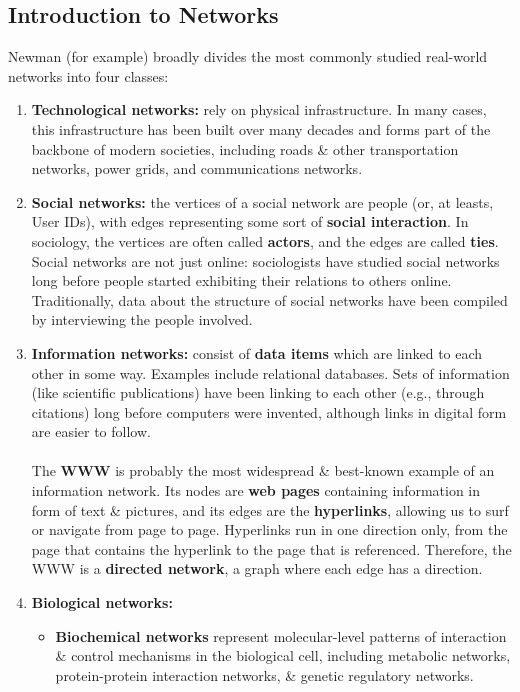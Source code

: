 \documentclass[a4paper,11pt]{article}
\begin{document}
\subsection{Introduction to Networks}
Newman (for example) broadly divides the most commonly studied real-world networks into four classes:
\begin{enumerate}
    \item   \textbf{Technological networks:} rely on physical infrastructure.
            In many cases, this infrastructure has been built over many decades and forms part of the backbone of modern societies, including roads \& other transportation networks, power grids, and communications networks.

    \item   \textbf{Social networks:} the vertices of a social network are people (or, at leasts, User IDs), with edges representing some sort of \textbf{social interaction}.
            In sociology, the vertices are often called \textbf{actors}, and the edges are called \textbf{ties}.
            Social networks are not just online: sociologists have studied social networks long before people started exhibiting their relations to others online.
            Traditionally, data about the structure of social networks have been compiled by interviewing the people involved.

    \item   \textbf{Information networks:} consist of \textbf{data items} which are linked to each other in some way.
            Examples include relational databases.
            Sets of information (like scientific publications) have been linking to each other (e.g., through citations) long before computers were invented, although links in digital form are easier to follow.
            \\\\
            The \textbf{WWW} is probably the most widespread \& best-known example of an information network.
            Its nodes are \textbf{web pages} containing information in form of text \& pictures, and its edges are the \textbf{hyperlinks}, allowing us to surf or navigate from page to page.
            Hyperlinks run in one direction only, from the page that contains the hyperlink to the page that is referenced.
            Therefore, the WWW is a \textbf{directed network}, a graph where each edge has a direction.

    \item   \textbf{Biological networks:}
            \begin{itemize}
                \item   \textbf{Biochemical networks} represent molecular-level patterns of interaction \& control mechanisms in the biological cell, including metabolic networks, protein-protein interaction networks, \& genetic regulatory networks.


\end{itemize}
\end{enumerate}
\end{document}

